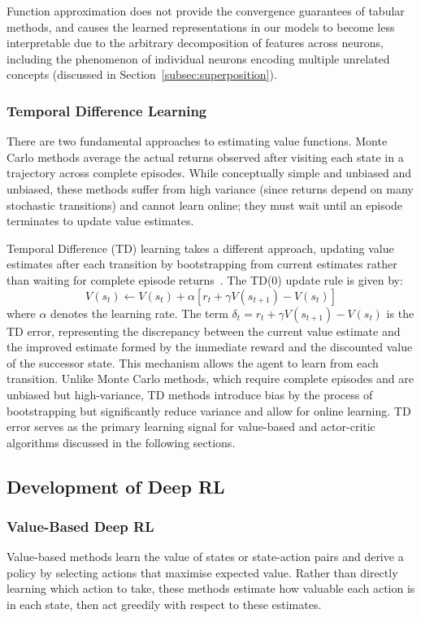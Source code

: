 Function approximation does not provide the convergence guarantees of tabular methods, and causes the learned representations in our models to become less interpretable due to the arbitrary decomposition of features across neurons, including the phenomenon of individual neurons encoding multiple unrelated concepts (discussed in Section~\ref{subsec:superposition}).

\subsubsection{Temporal Difference Learning}\label{subsubsec:td_learning}

There are two fundamental approaches to estimating value functions. Monte Carlo methods average the actual returns observed after visiting each state in a trajectory across complete episodes. While conceptually simple and unbiased and unbiased, these methods suffer from high variance (since returns depend on many stochastic transitions) and cannot learn online; they must wait until an episode terminates to update value estimates.

Temporal Difference (TD) learning takes a different approach, updating value estimates after each transition by bootstrapping from current estimates rather than waiting for complete episode returns~\citep{sutton2018reinforcement}. The TD(0) update rule is given by:
\[
V(s_t) \leftarrow V(s_t) + \alpha [r_t + \gamma V(s_{t+1}) - V(s_t)]
\]
where $\alpha$ denotes the learning rate. The term $\delta_t = r_t + \gamma V(s_{t+1}) - V(s_t)$ is the TD error, representing the discrepancy between the current value estimate and the improved estimate formed by the immediate reward and the discounted value of the successor state. This mechanism allows the agent to learn from each transition. Unlike Monte Carlo methods, which require complete episodes and are unbiased but high-variance, TD methods introduce bias by the process of bootstrapping but significantly reduce variance and allow for online learning. TD error serves as the primary learning signal for value-based and actor-critic algorithms discussed in the following sections.

\subsection{Development of Deep RL}\label{subsec:development_deep_rl}

\subsubsection{Value-Based Deep RL}\label{subsubsec:value_based_deep_rl}
Value-based methods learn the value of states or state-action pairs and derive a policy by selecting actions that maximise expected value. Rather than directly learning which action to take, these methods estimate how valuable each action is in each state, then act greedily with respect to these estimates.

